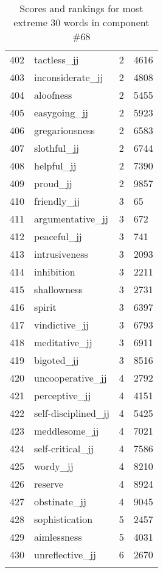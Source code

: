 \begin{longtable}[!htbp]{| rlr@{.}l |}
    402 & tactless\_jj & 2 & 4616 \\
    403 & inconsiderate\_jj & 2 & 4808 \\
    404 & aloofness & 2 & 5455 \\
    405 & easygoing\_jj & 2 & 5923 \\
    406 & gregariousness & 2 & 6583 \\
    407 & slothful\_jj & 2 & 6744 \\
    408 & helpful\_jj & 2 & 7390 \\
    409 & proud\_jj & 2 & 9857 \\
    410 & friendly\_jj & 3 & 65 \\
    411 & argumentative\_jj & 3 & 672 \\
    412 & peaceful\_jj & 3 & 741 \\
    413 & intrusiveness & 3 & 2093 \\
    414 & inhibition & 3 & 2211 \\
    415 & shallowness & 3 & 2731 \\
    416 & spirit & 3 & 6397 \\
    417 & vindictive\_jj & 3 & 6793 \\
    418 & meditative\_jj & 3 & 6911 \\
    419 & bigoted\_jj & 3 & 8516 \\
    420 & uncooperative\_jj & 4 & 2792 \\
    421 & perceptive\_jj & 4 & 4151 \\
    422 & self-disciplined\_jj & 4 & 5425 \\
    423 & meddlesome\_jj & 4 & 7021 \\
    424 & self-critical\_jj & 4 & 7586 \\
    425 & wordy\_jj & 4 & 8210 \\
    426 & reserve & 4 & 8924 \\
    427 & obstinate\_jj & 4 & 9045 \\
    428 & sophistication & 5 & 2457 \\
    429 & aimlessness & 5 & 4031 \\
    430 & unreflective\_jj & 6 & 2670 \\
    \hline
    \caption{Scores and rankings for most extreme 30 words in component \#68} \\
\end{longtable}
